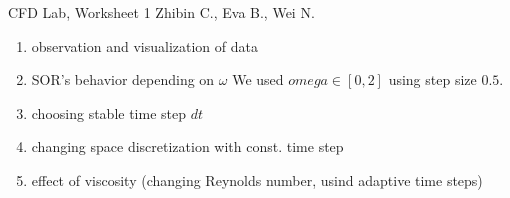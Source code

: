 \documentclass[a4paper]{article}
\begin{document}
{\Large CFD Lab, Worksheet 1} \newline
{\small Zhibin C., Eva B., Wei N.}

\begin{enumerate}
\item observation and visualization of data
\item SOR's behavior depending on $\omega$
We used $omega \in [0, 2]$ using step size $0.5$.


\item choosing stable time step $dt$
\item changing space discretization with const. time step
\item effect of viscosity (changing Reynolds number, usind adaptive time steps)
\end{enumerate}
\end{document}
